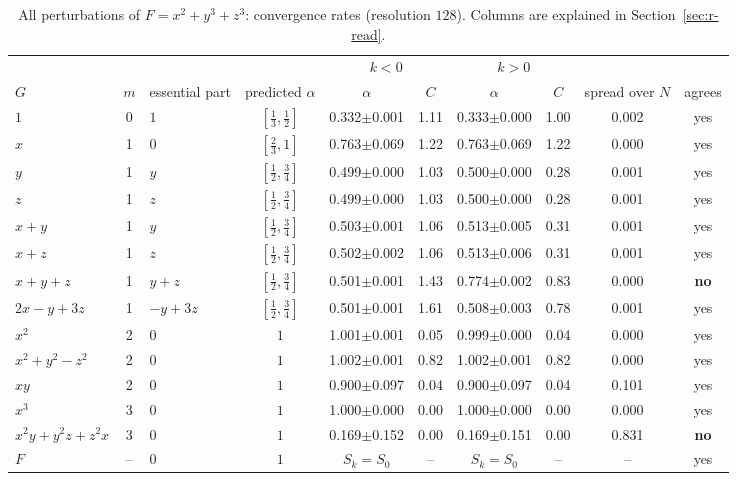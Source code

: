 \documentclass[12pt, a4paper]{article}
\theoremstyle{plain}
\theoremstyle{definition}
\theoremstyle{remark}
\theoremstyle{definition}
\begin{document}
\begin{table}[!h]
\centering
\footnotesize
\begin{adjustbox}{max width=\textwidth}
\begin{tabular}{l c l c c c c c c c}
\toprule
& & & & \multicolumn{2}{c}{$k<0$} & \multicolumn{2}{c}{$k>0$} & & \\
\cmidrule(lr){5-6}\cmidrule(lr){7-8}
$G$ & $m$ & essential part & predicted $\alpha$ & $\alpha$ & $C$ & $\alpha$ & $C$ & spread over $N$ & agrees \\
\midrule
$1$ & 0 & $1$ & $[\tfrac13,\tfrac12]$ & 0.332{\scriptsize$\pm$0.001} & 1.11 & 0.333{\scriptsize$\pm$0.000} & 1.00 & 0.002 & yes \\
$x$ & 1 & $0$ & $[\tfrac23,1]$ & 0.763{\scriptsize$\pm$0.069} & 1.22 & 0.763{\scriptsize$\pm$0.069} & 1.22 & 0.000 & yes \\
$y$ & 1 & $y$ & $[\tfrac12,\tfrac34]$ & 0.499{\scriptsize$\pm$0.000} & 1.03 & 0.500{\scriptsize$\pm$0.000} & 0.28 & 0.001 & yes \\
$z$ & 1 & $z$ & $[\tfrac12,\tfrac34]$ & 0.499{\scriptsize$\pm$0.000} & 1.03 & 0.500{\scriptsize$\pm$0.000} & 0.28 & 0.001 & yes \\
$x+y$ & 1 & $y$ & $[\tfrac12,\tfrac34]$ & 0.503{\scriptsize$\pm$0.001} & 1.06 & 0.513{\scriptsize$\pm$0.005} & 0.31 & 0.001 & yes \\
$x+z$ & 1 & $z$ & $[\tfrac12,\tfrac34]$ & 0.502{\scriptsize$\pm$0.002} & 1.06 & 0.513{\scriptsize$\pm$0.006} & 0.31 & 0.001 & yes \\
$x+y+z$ & 1 & $y + z$ & $[\tfrac12,\tfrac34]$ & 0.501{\scriptsize$\pm$0.001} & 1.43 & 0.774{\scriptsize$\pm$0.002} & 0.83 & 0.000 & \textbf{no} \\
$2x-y+3z$ & 1 & $-y + 3z$ & $[\tfrac12,\tfrac34]$ & 0.501{\scriptsize$\pm$0.001} & 1.61 & 0.508{\scriptsize$\pm$0.003} & 0.78 & 0.001 & yes \\
$x^2$ & 2 & $0$ & $1$ & 1.001{\scriptsize$\pm$0.001} & 0.05 & 0.999{\scriptsize$\pm$0.000} & 0.04 & 0.000 & yes \\
$x^2+y^2-z^2$ & 2 & $0$ & $1$ & 1.002{\scriptsize$\pm$0.001} & 0.82 & 1.002{\scriptsize$\pm$0.001} & 0.82 & 0.000 & yes \\
$xy$ & 2 & $0$ & $1$ & 0.900{\scriptsize$\pm$0.097} & 0.04 & 0.900{\scriptsize$\pm$0.097} & 0.04 & 0.101 & yes \\
$x^3$ & 3 & $0$ & $1$ & 1.000{\scriptsize$\pm$0.000} & 0.00 & 1.000{\scriptsize$\pm$0.000} & 0.00 & 0.000 & yes \\
$x^2y+y^2z+z^2x$ & 3 & $0$ & $1$ & 0.169{\scriptsize$\pm$0.152} & 0.00 & 0.169{\scriptsize$\pm$0.151} & 0.00 & 0.831 & \textbf{no} \\
$F$ & -- & $0$ & $1$ & $S_k=S_0$ & -- & $S_k=S_0$ & -- & -- & yes \\
\bottomrule
\end{tabular}
\end{adjustbox}
\caption[Rates for $x^2+y^3+z^3$]{All perturbations of $F=x^2+y^3+z^3$: convergence rates (resolution $128$). Columns are explained in Section~\ref{sec:r-read}.}
\label{tab:r-D4a-rates}
\end{table}
\end{document}

